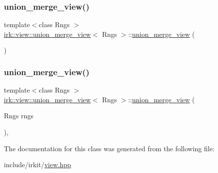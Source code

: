 \subsubsection{\texorpdfstring{union\+\_\+merge\+\_\+view()}{union\_merge\_view()}\hspace{0.1cm}{\footnotesize\ttfamily [1/2]}}
{\footnotesize\ttfamily template$<$class Rngs $>$ \\
\mbox{\hyperlink{classirk_1_1view_1_1union__merge__view}{irk\+::view\+::union\+\_\+merge\+\_\+view}}$<$ Rngs $>$\+::\mbox{\hyperlink{classirk_1_1view_1_1union__merge__view}{union\+\_\+merge\+\_\+view}} (\begin{DoxyParamCaption}{ }\end{DoxyParamCaption})\hspace{0.3cm}{\ttfamily [default]}}

\mbox{\label{classirk_1_1view_1_1union__merge__view_af6199af626f858573667d182400d01ec}} 
\subsubsection{\texorpdfstring{union\+\_\+merge\+\_\+view()}{union\_merge\_view()}\hspace{0.1cm}{\footnotesize\ttfamily [2/2]}}
{\footnotesize\ttfamily template$<$class Rngs $>$ \\
\mbox{\hyperlink{classirk_1_1view_1_1union__merge__view}{irk\+::view\+::union\+\_\+merge\+\_\+view}}$<$ Rngs $>$\+::\mbox{\hyperlink{classirk_1_1view_1_1union__merge__view}{union\+\_\+merge\+\_\+view}} (\begin{DoxyParamCaption}\item[{Rngs}]{rngs }\end{DoxyParamCaption})\hspace{0.3cm}{\ttfamily [inline]}, {\ttfamily [explicit]}}



The documentation for this class was generated from the following file\+:\begin{DoxyCompactItemize}
\item 
include/irkit/\mbox{\hyperlink{view_8hpp}{view.\+hpp}}\end{DoxyCompactItemize}
